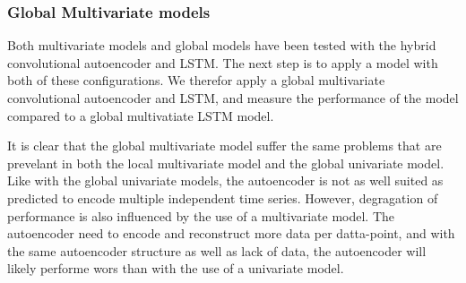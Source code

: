 





\subsubsection{Global Multivariate models}


Both multivariate models and global models have been tested with the hybrid convolutional autoencoder and LSTM.
The next step is to apply a model with both of these configurations.
We therefor apply a global multivariate convolutional autoencoder and LSTM, and measure the performance of the model
compared to a global multivatiate LSTM model.

It is clear that the global multivariate model suffer the same problems that are prevelant in both the local multivariate model
and the global univariate model.
Like with the global univariate models, the autoencoder is not as well suited as predicted to encode multiple independent time series.
However, degragation of performance is also influenced by the use of a multivariate model.
The autoencoder need to encode and reconstruct more data per datta-point, and with the same autoencoder structure
as well as lack of data, the autoencoder will likely performe wors than with the use of a univariate model.

